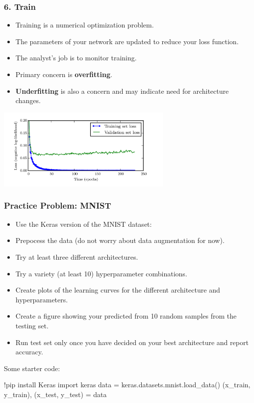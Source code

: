 \documentclass{beamer}
\begin{document}
\begin{frame}
    \frametitle{6. Train}

    \begin{itemize}
        \item Training is a numerical optimization problem.
        \item The parameters of your network are updated to reduce your loss function.
        \item The analyst’s job is to monitor training.
        \item Primary concern is \textbf{overfitting}.
        \item \textbf{Underfitting} is also a concern and may indicate need for architecture changes.
    \end{itemize}

    \begin{center}
        \includegraphics[height=4cm]{figs/train_val_example.png}
    \end{center}
    
\end{frame}

\begin{frame}[fragile]
    \frametitle{Practice Problem: MNIST}

    \begin{itemize}
        \item Use the Keras version of the MNIST dataset:
        \item Prepocess the data (do not worry about data augmentation for now).
        \item Try at least three different architectures.
        \item Try a variety (at least 10) hyperparameter combinations.
        \item Create plots of the learning curves for the different architecture and hyperparameters.
        \item Create a figure showing your predicted from 10 random samples from the testing set.
        \item Run test set only once you have decided on your best architecture and report accuracy.
    \end{itemize}
    \vskip20pt
    Some starter code:
    \begin{semiverbatim}
!pip install Keras
import keras          
data = keras.datasets.mnist.load_data()
(x_train, y_train), (x_test, y_test) = data
    \end{semiverbatim}    

\end{frame}
\end{document}
